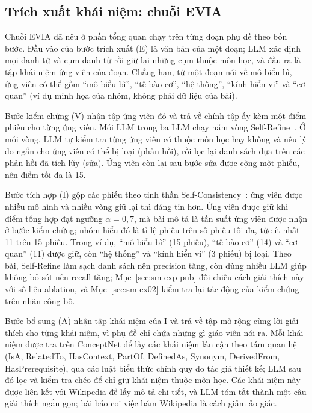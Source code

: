 \subsection{Trích xuất khái niệm: chuỗi EVIA}\label{sec:sm-evia}
Chuỗi EVIA đã nêu ở phần tổng quan chạy trên từng đoạn phụ đề theo bốn bước.
Đầu vào của bước trích xuất (E) là văn bản của một đoạn; LLM xác định mọi danh từ và cụm danh từ rồi giữ lại những cụm thuộc môn học, và đầu ra là tập khái niệm ứng viên của đoạn.
Chẳng hạn, từ một đoạn nói về mô biểu bì, ứng viên có thể gồm ``mô biểu bì'', ``tế bào cơ'', ``hệ thống'', ``kính hiển vi'' và ``cơ quan'' (ví dụ minh họa của nhóm, không phải dữ liệu của bài).

Bước kiểm chứng (V) nhận tập ứng viên đó và trả về chính tập ấy kèm một điểm phiếu cho từng ứng viên.
Mỗi LLM trong ba LLM chạy năm vòng Self-Refine~\cite{madaan2023selfrefine}.
Ở mỗi vòng, LLM tự kiểm tra từng ứng viên có thuộc môn học hay không và nêu lý do ngắn cho ứng viên có thể bị loại (phản hồi), rồi lọc lại danh sách dựa trên các phản hồi đã tích lũy (sửa).
Ứng viên còn lại sau bước sửa được cộng một phiếu, nên điểm tối đa là 15.

Bước tích hợp (I) gộp các phiếu theo tinh thần Self-Consistency~\cite{wang2023selfconsistency}: ứng viên được nhiều mô hình và nhiều vòng giữ lại thì đáng tin hơn.
Ứng viên được giữ khi điểm tổng hợp đạt ngưỡng $\alpha=0{,}7$, mà bài mô tả là tần suất ứng viên được nhận ở bước kiểm chứng; nhóm hiểu đó là tỉ lệ phiếu trên số phiếu tối đa, tức ít nhất 11 trên 15 phiếu.
Trong ví dụ, ``mô biểu bì'' (15 phiếu), ``tế bào cơ'' (14) và ``cơ quan'' (11) được giữ, còn ``hệ thống'' và ``kính hiển vi'' (3 phiếu) bị loại.
Theo bài, Self-Refine làm sạch danh sách nên precision tăng, còn dùng nhiều LLM giúp không bỏ sót nên recall tăng; Mục~\ref{sec:sm-exp-pub} đối chiếu cách giải thích này với số liệu ablation, và Mục~\ref{sec:sm-ex02} kiểm tra lại tác động của kiểm chứng trên nhãn công bố.

Bước bổ sung (A) nhận tập khái niệm của I và trả về tập mở rộng cùng lời giải thích cho từng khái niệm, vì phụ đề chỉ chứa những gì giáo viên nói ra.
Mỗi khái niệm được tra trên ConceptNet để lấy các khái niệm lân cận theo tám quan hệ (IsA, RelatedTo, HasContext, PartOf, DefinedAs, Synonym, DerivedFrom, HasPrerequisite), qua các luật biểu thức chính quy do tác giả thiết kế; LLM sau đó lọc và kiểm tra chéo để chỉ giữ khái niệm thuộc môn học.
Các khái niệm này được liên kết với Wikipedia để lấy mô tả chi tiết, và LLM tóm tắt thành một câu giải thích ngắn gọn; bài báo coi việc bám Wikipedia là cách giảm ảo giác.

